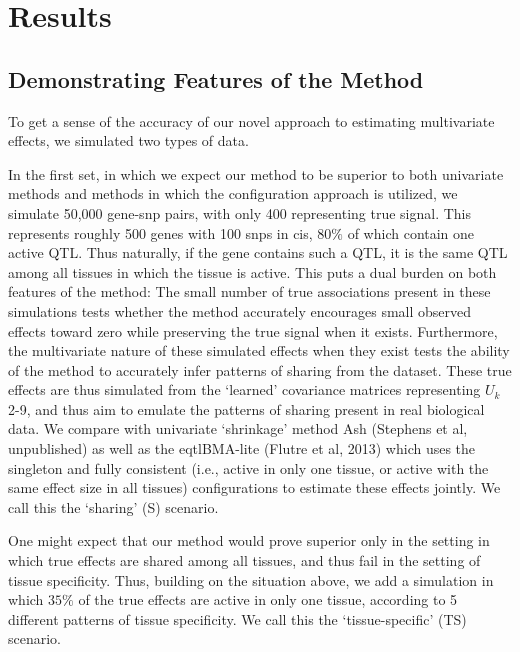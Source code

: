 \section{Results}
\subsection{Demonstrating Features of the Method}

To get a sense of the accuracy of our novel approach to estimating multivariate effects, we simulated two types of data. 

In the first set, in which we expect our method to be superior to both univariate methods and methods in which the configuration approach is utilized, we simulate 50,000 gene-snp pairs, with only 400 representing true signal. This represents roughly 500 genes with 100 snps in cis, $80\%$ of which contain one active QTL. Thus naturally, if the gene contains such a QTL, it is the same QTL among all tissues in which the tissue is active. This puts a dual burden on both features of the method: The small number of true associations present in these simulations tests whether the method accurately encourages small observed effects toward zero while preserving the true signal when it exists. Furthermore, the  multivariate nature of these simulated effects when they exist tests the ability of the method to accurately infer patterns of sharing from the dataset. These true effects are thus simulated from the `learned' covariance matrices representing $U_{k}$ 2-9, and thus aim to emulate the patterns of sharing present in real biological data. We compare with univariate `shrinkage' method Ash (Stephens et al, unpublished) as well as the eqtlBMA-lite (Flutre et al, 2013) which uses the singleton and fully consistent (i.e., active in only one tissue, or active with the same effect size in all tissues) configurations to estimate these effects jointly. We call this the `sharing' (S) scenario. 

One might expect that our method would prove superior only in the setting in which true effects are shared among all tissues, and thus fail in the setting of tissue specificity. Thus, building on the situation above, we add a simulation in which $35\%$ of the true effects are active in only one tissue, according to 5 different patterns of tissue specificity. We call this the `tissue-specific' (TS) scenario. 

